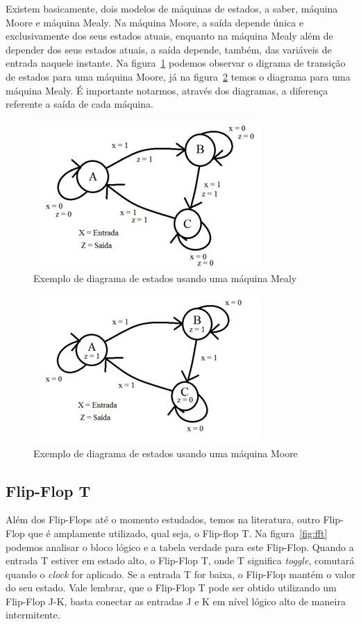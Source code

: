 \documentclass[12pt]{article}
\begin{document}
Existem basicamente, dois modelos de máquinas de estados, a saber, máquina Moore e máquina Mealy\cite{singh2006digital}. Na máquina Moore, a saída depende única e exclusivamente dos seus estados atuais, enquanto na máquina Mealy além de depender dos seus estados atuais, a saída depende, também, das variáveis de entrada naquele instante. Na figura~\ref{fig:diagrama-mealy}  podemos observar  o digrama de transição de estados para uma máquina Moore, já na figura~\ref{fig:diagrama-moore} temos o diagrama para uma máquina Mealy. É importante notarmos, através dos diagramas, a diferença referente a saída de cada máquina.   

\begin{figure}[h]
\centering
\includegraphics[width=.5\textwidth]{img/fig2MaquinaMealy.png}
\caption{Exemplo de diagrama de estados usando uma máquina Mealy}
\label{fig:diagrama-mealy}
\end{figure}

\begin{figure}[h]
\centering
\includegraphics[width=.5\textwidth]{img/fig3MaquinaMoore.png}
\caption{Exemplo de diagrama de estados usando uma máquina Moore}
\label{fig:diagrama-moore}
\end{figure}

\subsection{Flip-Flop T}
Além dos Flip-Flops até o momento estudados, temos na literatura, outro Flip-Flop que é amplamente utilizado, qual seja, o Flip-flop T. Na figura~\ref{fig:fft} podemos analisar o bloco lógico e a tabela verdade para este Flip-Flop. Quando a entrada T estiver em estado alto, o Flip-Flop T, onde T significa \textit{toggle}, comutará quando o \textit{clock} for aplicado. Se a entrada T for baixa, o Flip-Flop mantém o valor do seu estado. Vale lembrar, que o Flip-Flop T pode ser obtido utilizando um Flip-Flop J-K, basta conectar as entradas J e K em nível lógico alto de maneira intermitente.  
\end{document}
